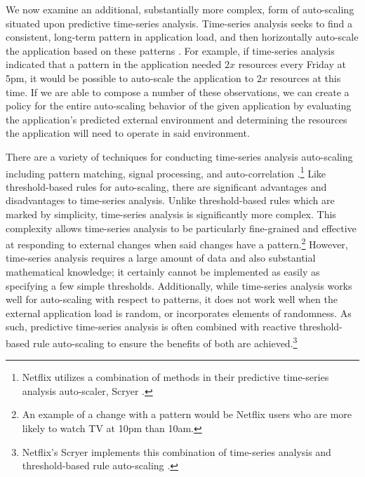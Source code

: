 We now examine an additional, substantially more complex, form of auto-scaling
situated upon predictive time-series analysis. Time-series analysis seeks to
find a consistent, long-term pattern in application load, and then horizontally auto-scale
the application based on these
patterns
\cite{auto-scaling-techniques-for-elastic-applications-in-cloud-environments}.
For example, if time-series analysis indicated that a pattern in the application needed
$2x$ resources every Friday at 5pm,
it would be possible to auto-scale the application to $2x$
resources at this time. If we are able to compose a number of these
observations, we can create a policy for the entire auto-scaling behavior of
the given application by evaluating the application's predicted external environment
and determining the resources the application will need to operate in said
environment.

There are a variety of techniques for conducting time-series analysis
auto-scaling including pattern matching, signal processing, and
auto-correlation
\cite{auto-scaling-techniques-for-elastic-applications-in-cloud-environments}.\footnote{Netflix utilizes a combination of methods in
their predictive time-series analysis auto-scaler,
Scryer \cite{netflix-scryer-part-ii}.}
Like threshold-based rules for auto-scaling, there are significant
advantages and disadvantages to time-series analysis. Unlike threshold-based
rules which are marked by simplicity, time-series analysis is significantly more
complex. This complexity allows time-series analysis to be particularly
fine-grained and effective
at responding to external changes when said changes have a pattern.\footnote{An
example of a change with a pattern would be Netflix users who are more likely to
watch TV at 10pm than 10am.} However, time-series analysis requires a
large amount of data and also substantial mathematical
knowledge; it certainly cannot be implemented as easily as specifying a few
simple thresholds. Additionally, while time-series analysis works well for
auto-scaling with respect to patterns, it does not work well when the external
application load is random, or incorporates elements of randomness. As such,
predictive time-series analysis is
often combined with reactive threshold-based rule auto-scaling to ensure the benefits of
both are achieved.\footnote{Netflix's Scryer implements this combination of
time-series analysis and threshold-based rule
auto-scaling \cite{netflix-scryer-part-ii}.}

